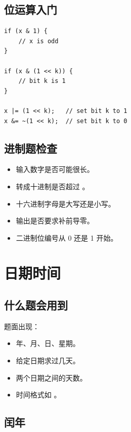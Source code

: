 \subsection{位运算入门}

\begin{lstlisting}
if (x & 1) {
    // x is odd
}

if (x & (1 << k)) {
    // bit k is 1
}

x |= (1 << k);   // set bit k to 1
x &= ~(1 << k);  // set bit k to 0
\end{lstlisting}


\subsection{进制题检查}

\begin{itemize}
  \item 输入数字是否可能很长。
  \item 转成十进制是否超过 。
  \item 十六进制字母是大写还是小写。
  \item 输出是否要求补前导零。
  \item 二进制位编号从 0 还是 1 开始。
\end{itemize}

\section{日期时间}\label{sec:05-14}

\subsection{什么题会用到}

题面出现：

\begin{itemize}
  \item 年、月、日、星期。
  \item 给定日期求过几天。
  \item 两个日期之间的天数。
  \item 时间格式如 。
\end{itemize}

\subsection{闰年}

